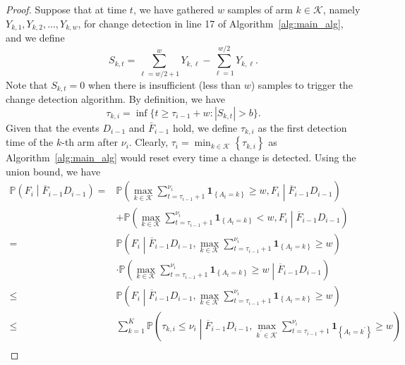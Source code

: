\documentclass[twoside]{article}
\def\Algref#1{Algorithm~\ref{#1}}
\def\1{\bm{1}}
\def\gK{{\mathcal{K}}}
\theoremstyle{plain}
\theoremstyle{definition}
\theoremstyle{remark}
\begin{document}
\begin{proof}
    Suppose that at time $t$, we have gathered $w$ samples of arm $k\in\gK$, namely $Y_{k,1}, Y_{k,2},\ldots, Y_{k,w}$, for change detection in line 17 of \Algref{alg:main_alg}, and we define
    \begin{equation}
        S_{k,t}= \sum^{w}_{\ell=w/2 +1}Y_{k,\ell}-\sum^{w/2}_{\ell=1}Y_{k,\ell}.            \label{eqn:s_def}
    \end{equation}
    Note that $S_{k,t}=0$ when there is insufficient (less than $w$) samples to trigger the change detection algorithm. By definition, we have
    \begin{equation}
        \tau_{k,i}=\inf \{t\geq \tau_{i-1}+w:\left\lvert S_{k,t}\right\rvert >b\}.
    \end{equation}
    Given that the events $D_{i-1}$ and $\bar{F}_{i-1}$ hold, we define $\tau_{k,i}$ as the first detection time of the $k$-th arm after $\nu_{i}$. Clearly, $\tau_{i}=\min _{k\in\gK} \left\{\tau_{k,i}\right\}$ as \Algref{alg:main_alg} would reset every time a change is detected. Using the union bound, we have
    \begin{subequations}
        \begin{align}
            \mathbb{P}\left(F_{i}\middle| \overline{F}_{i-1}D_{i-1}\right)=&\mathbb{P}\left(\max_{k\in\mathcal{K}} \sum_{t=\tau_{i-1}+1}^{\nu_{i}}\1_{\left\{A_{t}=k\right\}}\geq w,F_{i}\middle| \overline{F}_{i-1}D_{i-1}\right)\\
            &+\mathbb{P}\left(\max_{k\in\mathcal{K}} \sum_{t=\tau_{i-1}+1}^{\nu_{i}}\1_{\left\{A_{t}=k\right\}}<w,F_{i}\middle| \overline{F}_{i-1}D_{i-1}\right) \label{eqn:false_al_p_b}\\
            =&\mathbb{P}\left(F_{i}\middle| \overline{F}_{i-1}D_{i-1},\max_{k\in\mathcal{K}} \sum_{t=\tau_{i-1}+1}^{\nu_{i}}\1_{\left\{A_{t}=k\right\}}\geq w\right)\label{eqn:false_al_p_c}\\
            &\cdot \mathbb{P}\left(\max_{k\in\mathcal{K}} \sum_{t=\tau_{i-1}+1}^{\nu_{i}}\1_{\left\{A_{t}=k\right\}}\geq w\middle| \overline{F}_{i-1}D_{i-1}\right)\label{eqn:false_al_p_d}\\
            \leq &\mathbb{P}\left(F_{i}\middle|\overline{F}_{i-1}D_{i-1},\max_{k\in\mathcal{K}} \sum_{t=\tau_{i-1}+1}^{\nu_{i}}\1_{\left\{A_{t}=k\right\}}\geq w\right)\label{eqn:false_al_p_e}\\
            \leq & \sum^{K}_{k=1}\mathbb{P}\left(\tau_{k,i}\leq \nu_{i}\middle|\overline{F}_{i-1}D_{i-1}, \max_{k^{\prime}\in\mathcal{K}} \sum_{t=\tau_{i-1}+1}^{\nu_{i}}\1_{\left\{A_{t}=k^{\prime}\right\}}\geq w\right)\label{eqn:max_1}\\

\end{align}
\end{subequations}
\end{proof}
\end{document}
